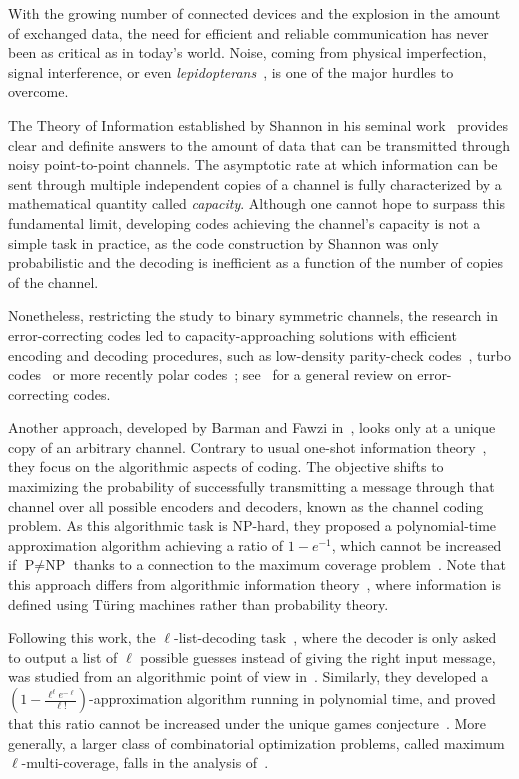 With the growing number of connected devices and the explosion in the amount of exchanged data, the need for efficient and reliable communication has never been as critical as in today's world. Noise, coming from physical imperfection, signal interference, or even \emph{lepidopterans}~\cite{Hopper81}, is one of the major hurdles to overcome.

The Theory of Information established by Shannon in his seminal work~\cite{Shannon48} provides clear and definite answers to the amount of data that can be transmitted through noisy point-to-point channels. The asymptotic rate at which information can be sent through multiple independent copies of a channel is fully characterized by a mathematical quantity called \emph{capacity}. Although one cannot hope to surpass this fundamental limit, developing codes achieving the channel's capacity is not a simple task in practice, as the code construction by Shannon was only probabilistic and the decoding is inefficient as a function of the number of copies of the channel.

Nonetheless, restricting the study to binary symmetric channels, the research in error-correcting codes led to capacity-approaching solutions with efficient encoding and decoding procedures, such as low-density parity-check codes~\cite{Gallager62}, turbo codes~\cite{BG96} or more recently polar codes~\cite{Arikan09}; see~\cite{RU08} for a general review on error-correcting codes.

Another approach, developed by Barman and Fawzi in~\cite{BF18}, looks only at a unique copy of an arbitrary channel. Contrary to usual one-shot information theory~\cite{RWW06,Tomamichel12,TBR16}, they focus on the algorithmic aspects of coding. The objective shifts to maximizing the probability of successfully transmitting a message through that channel over all possible encoders and decoders, known as the channel coding problem. As this algorithmic task is \textrm{NP}-hard, they proposed a polynomial-time approximation algorithm achieving a ratio of $1-e^{-1}$, which cannot be increased if $\textrm{P}\not=\textrm{NP}$ thanks to a connection to the maximum coverage problem~\cite{Feige98}. Note that this approach differs from algorithmic information theory~\cite{Chaitin77}, where information is defined using Türing machines rather than probability theory.

Following this work, the $\ell$-list-decoding task~\cite{Elias57,Wozencraft58}, where the decoder is only asked to output a list of $\ell$ possible guesses instead of giving the right input message, was studied from an algorithmic point of view in~\cite{BFGG20}. Similarly, they developed a $\left(1-\frac{\ell^{\ell}e^{-\ell}}{\ell!}\right)$-approximation algorithm running in polynomial time, and proved that this ratio cannot be increased under the unique games conjecture~\cite{Khot02}. More generally, a larger class of combinatorial optimization problems, called maximum $\ell$-multi-coverage, falls in the analysis of~\cite{BFGG20}.

